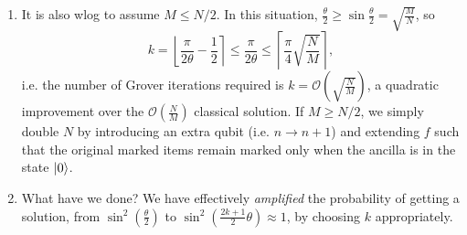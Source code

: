 \begin{enumerate}
    \item It is also wlog to assume $M \leq N/2$. In this situation, $\frac{\theta}{2} \geq \sin \frac{\theta}{2} = \sqrt{\frac{M}{N}}$, so
    \[
        k = \left\lfloor \frac{\pi}{2\theta} - \frac{1}{2} \right\rceil \leq \frac{\pi}{2\theta} \leq \left\lceil \frac{\pi}{4}\sqrt{\frac{N}{M}} \right\rceil,
    \]
    i.e. the number of Grover iterations required is $k = \mathcal{O}(\sqrt{\frac{N}{M}})$, a quadratic improvement over the $\mathcal{O}(\frac{N}{M})$ classical solution. If $M \geq N/2$, we simply double $N$ by introducing an extra qubit (i.e. $n \rightarrow n+1$) and extending $f$ such that the original marked items remain marked only when the ancilla is in the state $\ket{0}$.

    \item What have we done? We have effectively \textit{amplified} the probability of getting a solution, from $\sin^2\left(\frac{\theta}{2}\right)$ to $\sin^2\left(\frac{2k+1}{2}\theta \right) \approx 1$, by choosing $k$ appropriately. 


    
\end{enumerate}









